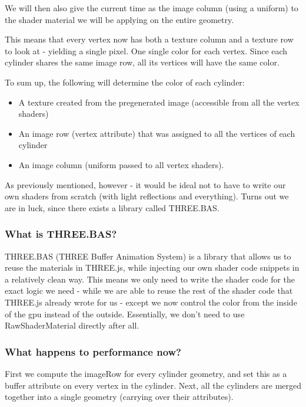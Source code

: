 We will then also give the current time as the image column (using a
uniform) to the shader material we will be applying on the entire
geometry.

This means that every vertex now has both a texture column and a texture
row to look at - yielding a single pixel. One single color for each
vertex. Since each cylinder shares the same image row, all its vertices
will have the same color.

To sum up, the following will determine the color of each cylinder:

\begin{itemize}
\tightlist
\item
  A texture created from the pregenerated image (accessible from all the
  vertex shaders)
\item
  An image row (vertex attribute) that was assigned to all the vertices
  of each cylinder
\item
  An image column (uniform passed to all vertex shaders).
\end{itemize}

As previously mentioned, however - it would be ideal not to have to
write our own shaders from scratch (with light reflections and
everything). Turns out we are in luck, since there exists a library
called THREE.BAS.

\hypertarget{what-is-three.bas}{%
\subsubsection{What is THREE.BAS?}\label{what-is-three.bas}}

THREE.BAS (THREE Buffer Animation System) is a library that allows us to
reuse the materials in THREE.js, while injecting our own shader code
snippets in a relatively clean way. This means we only need to write the
shader code for the exact logic we need - while we are able to reuse the
rest of the shader code that THREE.js already wrote for us - except we
now control the color from the inside of the gpu instead of the outside.
Essentially, we don't need to use RawShaderMaterial directly after all.

\hypertarget{what-happens-to-performance-now}{%
\subsubsection{What happens to performance
now?}\label{what-happens-to-performance-now}}

First we compute the imageRow for every cylinder geometry, and set this
as a buffer attribute on every vertex in the cylinder. Next, all the
cylinders are merged together into a single geometry (carrying over
their attributes).

